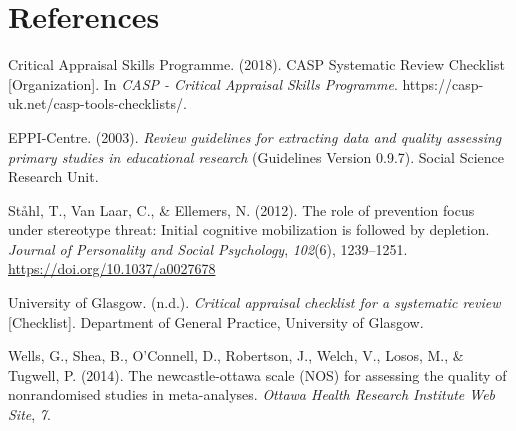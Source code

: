 \documentclass[
  doc, a4paper]{apa7}
\newlength{\cslhangindent}
\newenvironment{CSLReferences}[2] %
 {\begin{list}{}{%
  \setlength{\itemindent}{0pt}
  \setlength{\leftmargin}{0pt}
  \setlength{\parsep}{0pt}
  \ifodd #1
   \setlength{\leftmargin}{\cslhangindent}
   \setlength{\itemindent}{-1\cslhangindent}
  \fi
  \setlength{\itemsep}{#2\baselineskip}}}
 {\end{list}}
\begin{document}
\section{References}\label{references}

\label{refs}
\begin{CSLReferences}{1}{0}
Critical Appraisal Skills Programme. (2018). {CASP Systematic Review Checklist} {[}Organization{]}. In \emph{CASP - Critical Appraisal Skills Programme}. https://casp-uk.net/casp-tools-checklists/.

EPPI-Centre. (2003). \emph{Review guidelines for extracting data and quality assessing primary studies in educational research} (Guidelines Version 0.9.7). Social Science Research Unit.

Ståhl, T., Van Laar, C., \& Ellemers, N. (2012). The role of prevention focus under stereotype threat: {Initial} cognitive mobilization is followed by depletion. \emph{Journal of Personality and Social Psychology}, \emph{102}(6), 1239--1251. \url{https://doi.org/10.1037/a0027678}

University of Glasgow. (n.d.). \emph{Critical appraisal checklist for a systematic review} {[}Checklist{]}. Department of General Practice, University of Glasgow.

Wells, G., Shea, B., O'Connell, D., Robertson, J., Welch, V., Losos, M., \& Tugwell, P. (2014). The newcastle-ottawa scale ({NOS}) for assessing the quality of nonrandomised studies in meta-analyses. \emph{Ottawa Health Research Institute Web Site}, \emph{7}.

\end{CSLReferences}
\end{document}
